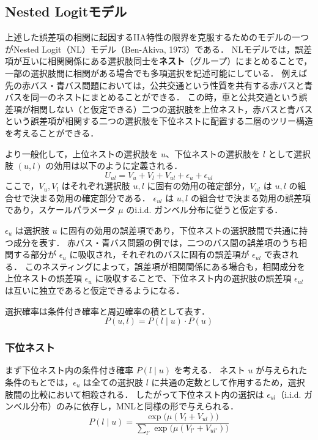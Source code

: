\subsection{Nested Logitモデル}\label{ssec:nested_logit}
上述した誤差項の相関に起因するIIA特性の限界を克服するためのモデルの一つがNested Logit（NL）モデル（Ben-Akiva, 1973）である．
NLモデルでは，誤差項が互いに相関関係にある選択肢同士を\textbf{ネスト}（グループ）にまとめることで，一部の選択肢間に相関がある場合でも多項選択を記述可能にしている．
例えば先の赤バス・青バス問題においては，公共交通という性質を共有する赤バスと青バスを同一のネストにまとめることができる．
この時，車と公共交通という誤差項が相関しない（と仮定できる）二つの選択肢を上位ネスト，赤バスと青バスという誤差項が相関する二つの選択肢を下位ネストに配置する二層のツリー構造を考えることができる．

より一般化して，上位ネストの選択肢を $u$、下位ネストの選択肢を $l$ として選択肢 $(u,l)$ の効用は以下のように定義される．
\begin{equation}
  U_{ul} = V_u + V_l + V_{ul} + \epsilon_u + \epsilon_{ul}
\end{equation}
ここで，$V_u, V_l$ はそれぞれ選択肢 $u, l$ に固有の効用の確定部分，$V_{ul}$ は $u, l$ の組合せで決まる効用の確定部分である．
$\epsilon_{ul}$ は $u, l$ の組合せで決まる効用の誤差項であり，スケールパラメータ $\mu$ のi.i.d. ガンベル分布に従うと仮定する．

$\epsilon_u$ は選択肢 $u$ に固有の効用の誤差項であり，下位ネストの選択肢間で共通に持つ成分を表す．
赤バス・青バス問題の例では，二つのバス間の誤差項のうち相関する部分が $\epsilon_u$ に吸収され，それぞれのバスに固有の誤差項が $\epsilon_{ul}$ で表される．
このネスティングによって，誤差項が相関関係にある場合も，相関成分を上位ネストの誤差項 $\epsilon_u$ に吸収することで、下位ネスト内の選択肢の誤差項 $\epsilon_{ul}$ は互いに独立であると仮定できるようになる．

選択確率は条件付き確率と周辺確率の積として表す．
\begin{equation}
  P(u,l) = P(l \mid u) \cdot P(u)
\end{equation}

\subsubsection{下位ネスト}
まず下位ネスト内の条件付き確率 $P(l \mid u)$ を考える．
ネスト $u$ が与えられた条件のもとでは，$\epsilon_u$ は全ての選択肢 $l$ に共通の定数として作用するため，選択肢間の比較において相殺される．
したがって下位ネスト内の選択は $\epsilon_{ul}$（i.i.d. ガンベル分布）のみに依存し，MNLと同様の形で与えられる．
\begin{equation}\label{eq:nl-cond}
  P(l \mid u) = \frac{\exp\bigl(\mu (V_l + V_{ul})\bigr)}{\displaystyle\sum_{l'} \exp\bigl(\mu (V_{l'} + V_{ul'})\bigr)}
\end{equation}

